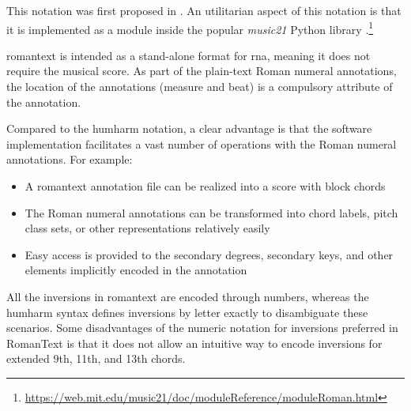

This notation was first proposed in
\textcite{gotham2019romantext}. An utilitarian aspect of
this notation is that it is implemented as a module inside
the popular \emph{music21} Python library
\parencite{cuthbert2010music21}.\footnote{\href{https://web.mit.edu/music21/doc/moduleReference/moduleRoman.html}{https://web.mit.edu/music21/doc/moduleReference/moduleRoman.html}}


\gls{romantext} is intended as a stand-alone format for
\gls{rna}, meaning it does not require the musical score. As
part of the plain-text Roman numeral annotations, the
location of the annotations (measure and beat) is a
compulsory attribute of the annotation.

Compared to the \gls{humharm} notation, a clear advantage is
that the software implementation facilitates a vast number
of operations with the Roman numeral annotations. For
example:

\begin{itemize}
    \item A \gls{romantext} annotation file can be realized
    into a score with block chords
    \item The Roman numeral annotations can be transformed
    into chord labels, pitch class sets, or other
    representations relatively easily
    \item Easy access is provided to the secondary degrees,
    secondary keys, and other elements implicitly encoded in
    the annotation
\end{itemize}

All the inversions in \gls{romantext} are encoded through
numbers, whereas the \gls{humharm} syntax defines inversions
by letter exactly to disambiguate these scenarios. Some
disadvantages of the numeric notation for inversions
preferred in RomanText is that it does not allow an
intuitive way to encode inversions for extended 9th, 11th,
and 13th chords. 
